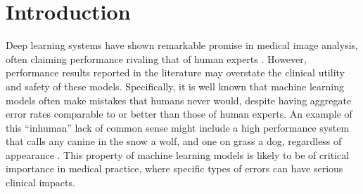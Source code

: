 \documentclass[sigconf]{acmart}
\begin{document}


\maketitle

\section{Introduction}
Deep learning systems have shown remarkable promise in medical image analysis, often claiming performance rivaling that of human experts \citep{esteva2019guide}. 
 However, performance results reported in the literature may overstate the clinical utility and safety of these models.  
 Specifically, it is well known that machine learning models often make mistakes that humans never would, despite having aggregate error rates comparable to or better than those of human experts. An example of this ``inhuman'' lack of common sense might include a high performance system that calls any canine in the snow a wolf, and one on grass a dog, regardless of appearance \citep{ribeiro2016should}.
This property of machine learning models is likely to be of critical importance in medical practice, where specific types of errors can have serious clinical impacts. 
 
\end{document}
